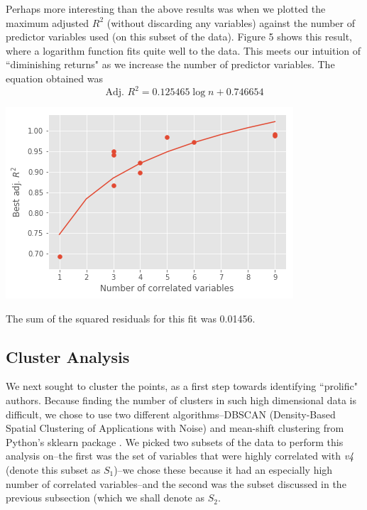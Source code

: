 \documentclass[12pt,a4paper,twocolumn]{article}
\begin{document}
	Perhaps more interesting than the above results was when we plotted the maximum adjusted $R^2$ (without discarding any variables) against the number of predictor variables used (on this subset of the data). Figure 5 shows this result, where a logarithm function fits quite well to the data. This meets our intuition of ``diminishing returns" as we increase the number of predictor variables. The equation obtained was
	\begin{equation}
	\text{Adj. } R^2 = 0.125465 \log n + 0.746654
	\end{equation}
	
	\includegraphics[scale=0.5]{fig5.png}
	\begingroup
	\endgroup
	\hfill\break
	
	The sum of the squared residuals for this fit was 0.01456.
	
	\subsection{Cluster Analysis}
	We next sought to cluster the points, as a first step towards identifying ``prolific" authors. Because finding the number of clusters in such high dimensional data is difficult, we chose to use two different algorithms--DBSCAN (Density-Based Spatial Clustering of Applications with Noise)\cite{ester1996density} and mean-shift clustering \cite{comaniciu2002mean} from Python's sklearn package \cite{scikit-learn}. We picked two subsets of the data to perform this analysis on--the first was the set of variables that were highly correlated with \textit{v4} (denote this subset as $S_1$)--we chose these because it had an especially high number of correlated variables--and the second was the subset discussed in the previous subsection (which we shall denote as $S_2$.
	
\end{document}

